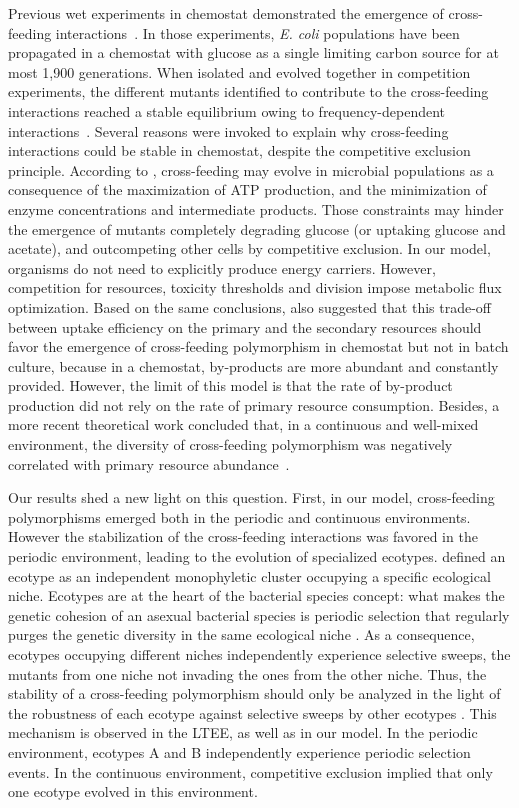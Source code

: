 Previous wet experiments in chemostat demonstrated the emergence of cross-feeding interactions~\citep{helling-et-al-1987,rosenzweig-et-al-1994,treves-et-al-1998}. In those experiments, \textit{E. coli} populations have been propagated in a chemostat with glucose as a single limiting carbon source for at most 1,900 generations. When isolated and evolved together in competition experiments, the different mutants identified to contribute to the cross-feeding interactions reached a stable equilibrium owing to frequency-dependent interactions~\citep{rosenzweig-et-al-1994}. Several reasons were invoked to explain why cross-feeding interactions could be stable in chemostat, despite the competitive exclusion principle. According to \cite{pfeiffer-bonhoeffer-2004}, cross-feeding may evolve in microbial populations as a consequence of the maximization of ATP production, and the minimization of enzyme concentrations and intermediate products. Those constraints may hinder the emergence of mutants completely degrading glucose (or uptaking glucose and acetate), and outcompeting other cells by competitive exclusion. In our model, organisms do not need to explicitly produce energy carriers.
However, competition for resources, toxicity thresholds and division impose metabolic flux optimization. Based on the same conclusions, \cite{doebeli-2002} also suggested that this trade-off between uptake efficiency on the primary and the secondary resources should favor the emergence of cross-feeding polymorphism in chemostat but not in batch culture, because in a chemostat, by-products are more abundant and constantly provided. However, the limit of this model is that the rate of by-product production did not rely on the rate of primary resource consumption. Besides, a more recent theoretical work concluded that, in a continuous and well-mixed environment, the diversity of cross-feeding polymorphism was negatively correlated with primary resource abundance~\citep{gerlee-lundh-2010b}.

Our results shed a new light on this question. First, in our model, cross-feeding polymorphisms emerged both in the periodic and continuous environments. However the stabilization of the cross-feeding interactions was favored in the periodic environment, leading to the evolution of specialized ecotypes. \cite{cohan-2002} defined an ecotype as an independent monophyletic cluster occupying a specific ecological niche. Ecotypes are at the heart of the bacterial species concept: what makes the genetic cohesion of an asexual bacterial species is periodic selection that regularly purges the genetic diversity in the same ecological niche \citep{cohan-2002}. As a consequence, ecotypes occupying different niches independently experience selective sweeps, the mutants from one niche not invading the ones from the other niche. Thus, the stability of a cross-feeding polymorphism should only be analyzed in the light of the robustness of each ecotype against selective sweeps by other ecotypes \citep{cohan-2002}. This mechanism is observed in the LTEE, as well as in our model. In the periodic environment, ecotypes A and B independently experience periodic selection events. In the continuous environment, competitive exclusion implied that only one ecotype evolved in this environment.

